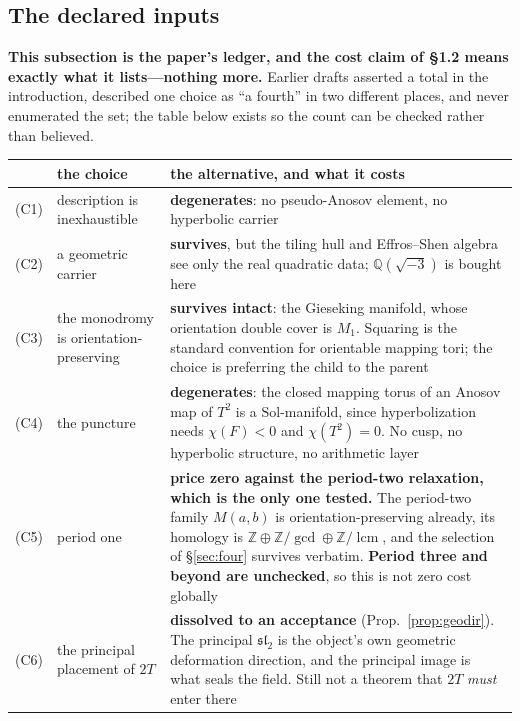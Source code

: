 \documentclass[11pt,reqno]{amsart}
\theoremstyle{plain}
\theoremstyle{definition}
\theoremstyle{remark}
\newcommand{\Q}{\mathbb{Q}}
\newcommand{\Z}{\mathbb{Z}}
\newcommand{\sll}{\mathfrak{sl}}
\begin{document}
\subsection{The declared inputs}\label{sec:inputs}

\textbf{This subsection is the paper's ledger, and the cost claim of \S1.2 means exactly
what it lists---nothing more.} Earlier drafts asserted a total in the introduction,
described one choice as ``a fourth'' in two different places, and never enumerated the
set; the table below exists so the count can be checked rather than believed.

\begin{table}[h]
\centering\small
\begin{tabular}{@{}p{}p{}p{}@{}}
\toprule
 & the choice & the alternative, and what it costs\\
\midrule
(C1) & description is inexhaustible & \textbf{degenerates}: no pseudo-Anosov element, no hyperbolic carrier\\
(C2) & a geometric carrier & \textbf{survives}, but the tiling hull and Effros--Shen algebra see only the real quadratic data; $\Q(\sqrt{-3})$ is bought here\\
(C3) & the monodromy is orientation-preserving & \textbf{survives intact}: the Gieseking manifold, whose orientation double cover is $M_1$. Squaring is the standard convention for orientable mapping tori; the choice is preferring the child to the parent\\
(C4) & the puncture & \textbf{degenerates}: the closed mapping torus of an Anosov map of $T^2$ is a $\mathrm{Sol}$-manifold, since hyperbolization needs $\chi(F)<0$ and $\chi(T^2)=0$. No cusp, no hyperbolic structure, no arithmetic layer\\
(C5) & period one & \textbf{price zero against the period-two relaxation, which is the only one tested.} The period-two family $M(a,b)$ is orientation-preserving already, its homology is $\Z\oplus\Z/\!\gcd\oplus\Z/\!\operatorname{lcm}$, and the selection of \S\ref{sec:four} survives verbatim. \textbf{Period three and beyond are unchecked}, so this is not zero cost globally\\
(C6) & the principal placement of $2T$ & \textbf{dissolved to an acceptance} (Prop.~\ref{prop:geodir}). The principal $\sll_2$ is the object's own geometric deformation direction, and the principal image is what seals the field. Still not a theorem that $2T$ \emph{must} enter there\\

\end{tabular}
\end{table}
\end{document}
